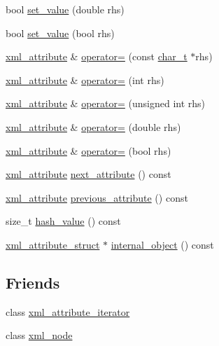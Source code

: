\begin{DoxyCompactItemize}
\item 
bool \hyperlink{classpugi_1_1xml__attribute_a5e58f7565792ba3afd432325f824f1b3}{set\-\_\-value} (double rhs)
\item 
bool \hyperlink{classpugi_1_1xml__attribute_a33ab85a706a18f88241081ab8b0f823f}{set\-\_\-value} (bool rhs)
\item 
\hyperlink{classpugi_1_1xml__attribute}{xml\-\_\-attribute} \& \hyperlink{classpugi_1_1xml__attribute_a957f7613ba25623fa3bdf1c50346b869}{operator=} (const \hyperlink{namespacepugi_aef5a7a62cba0507542220ea15afe39df}{char\-\_\-t} $\ast$rhs)
\item 
\hyperlink{classpugi_1_1xml__attribute}{xml\-\_\-attribute} \& \hyperlink{classpugi_1_1xml__attribute_a15f8f489bf3170dbadf28d4a89b20201}{operator=} (int rhs)
\item 
\hyperlink{classpugi_1_1xml__attribute}{xml\-\_\-attribute} \& \hyperlink{classpugi_1_1xml__attribute_a7f9f6b7ef7456873cc1c4957a806c958}{operator=} (unsigned int rhs)
\item 
\hyperlink{classpugi_1_1xml__attribute}{xml\-\_\-attribute} \& \hyperlink{classpugi_1_1xml__attribute_a4383afaf2e420ed45c563b2b82a3661f}{operator=} (double rhs)
\item 
\hyperlink{classpugi_1_1xml__attribute}{xml\-\_\-attribute} \& \hyperlink{classpugi_1_1xml__attribute_ae23d29ab032d5ff7c875f5bbe4d6ab3c}{operator=} (bool rhs)
\item 
\hyperlink{classpugi_1_1xml__attribute}{xml\-\_\-attribute} \hyperlink{classpugi_1_1xml__attribute_a71b0ee33f833781a94d6d35adfc0daac}{next\-\_\-attribute} () const 
\item 
\hyperlink{classpugi_1_1xml__attribute}{xml\-\_\-attribute} \hyperlink{classpugi_1_1xml__attribute_aee4fc29d1645bddc70f1a174654b9d10}{previous\-\_\-attribute} () const 
\item 
size\-\_\-t \hyperlink{classpugi_1_1xml__attribute_a1c9776e159263d00082a395891d8470f}{hash\-\_\-value} () const 
\item 
\hyperlink{structpugi_1_1xml__attribute__struct}{xml\-\_\-attribute\-\_\-struct} $\ast$ \hyperlink{classpugi_1_1xml__attribute_aa8543b8406bfddd2607c8dcdb54c5369}{internal\-\_\-object} () const 
\end{DoxyCompactItemize}
\subsection*{Friends}
\begin{DoxyCompactItemize}
\item 
class \hyperlink{classpugi_1_1xml__attribute_aeff34dec57ee910e3344631528969539}{xml\-\_\-attribute\-\_\-iterator}
\item 
class \hyperlink{classpugi_1_1xml__attribute_a156d917a92815c7b593bd5ef19f6d5fb}{xml\-\_\-node}
\end{DoxyCompactItemize}



